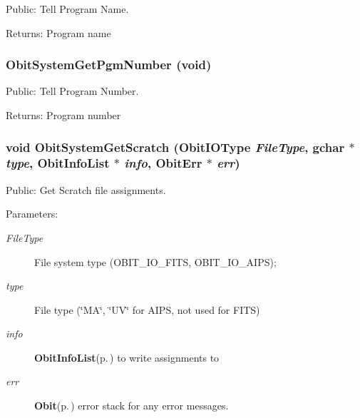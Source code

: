 Public: Tell Program Name. 

\begin{Desc}
\item[Returns:]Program name \end{Desc}
\subsubsection{ Obit\-System\-Get\-Pgm\-Number (void)}\label{ObitSystem_8h_a15}


Public: Tell Program Number. 

\begin{Desc}
\item[Returns:]Program number \end{Desc}
\subsubsection{\setlength{\rightskip}{0pt plus 5cm}void Obit\-System\-Get\-Scratch (Obit\-IOType {\em File\-Type}, gchar $\ast$ {\em type}, {\bf Obit\-Info\-List} $\ast$ {\em info}, {\bf Obit\-Err} $\ast$ {\em err})}\label{ObitSystem_8h_a9}


Public: Get Scratch file assignments. 

\begin{Desc}
\item[Parameters:]
\begin{description}
\item[{\em File\-Type}]File system type (OBIT\_\-IO\_\-FITS, OBIT\_\-IO\_\-AIPS); \item[{\em type}]File type (\char`\"{}MA\char`\"{}, \char`\"{}UV\char`\"{} for AIPS, not used for FITS) \item[{\em info}]{\bf Obit\-Info\-List}{\rm (p.\,\pageref{structObitInfoList})} to write assignments to \item[{\em err}]{\bf Obit}{\rm (p.\,\pageref{structObit})} error stack for any error messages. \end{description}
\end{Desc}
